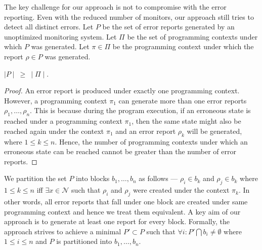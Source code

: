 The key challenge for our approach is not to compromise with the error reporting. Even with the reduced 
number of monitors, our approach still tries to detect all distinct errors. Let 
$P$ be the set of error reports generated by an unoptimized monitoring system. 
Let $\Pi$ be the set of programming contexts under which $P$ was generated. Let 
$\pi \in \Pi$ be the programming context under which the report $\rho \in P$ was 
generated.

\begin{theorem}
$\mid P\mid~\ge~\mid \Pi \mid$.
\end{theorem}

\begin{proof}
An error report is produced under exactly one programming context. However, a 
programming context $\pi_1$ can generate more than one error reports $\rho_1, 
\ldots ,\rho_n$. This is because during the program execution, if an erroneous 
state is reached under a programming context $\pi_1$, then the same state might 
also be reached again under the context $\pi_1$ and an error report 
$\rho_k$ will be generated, where $1 \le k \le n$. Hence, the number of 
programming contexts under which an erroneous state can be reached cannot be 
greater than the number of error reports.
\end{proof}

We partition the set $P$ into blocks $b_1, \ldots , b_n$ as follows --- $\rho_i 
\in b_k$ and $\rho_j \in b_k$ where  $1 \le k \le n$ iff $\exists x \in \mathcal{N}$
 such that $\rho_i$ and $\rho_j$ were created under the context $\pi_k$. 
In other words, all error reports that fall under one block are created under 
same programming context and hence we treat them equivalent. A key aim of our 
approach is to generate at least one report for every block. Formally, the approach strives to achieve a minimal $P' 
\subset P$ such that $\forall i : P' \bigcap b_i \ne \emptyset$ where $1 \le i 
\le n$ and $P$ is partitioned into $b_1, \ldots, b_n$.











